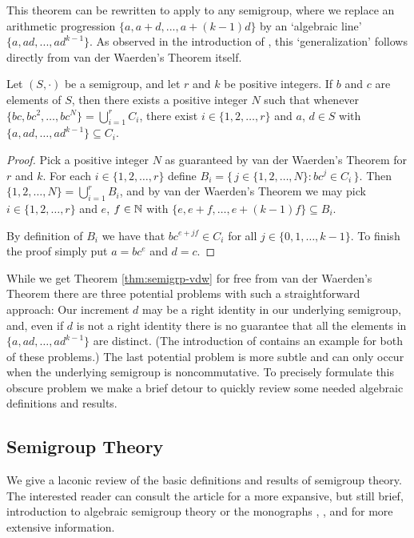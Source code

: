 This theorem can be rewritten to apply to any semigroup, where we replace an arithmetic progression $\{a, a+d, ..., a+(k-1)d\}$ by an `algebraic line' $\{a, ad, ..., ad^{k-1}\}$. As observed in the introduction of \cite{Bergelson:1992fk}, this `generalization' follows directly from van der Waerden's Theorem itself. 

\begin{thm}
  \label{thm:semigrp-vdw}
  Let $(S, \cdot)$ be a semigroup, and let $r$ and $k$ be positive integers.
  If $b$ and $c$ are elements of $S$, then there exists a positive integer $N$ such that whenever $\{bc, bc^2, \ldots, bc^N\} = \bigcup_{i=1}^r C_i$, there exist $i \in \{1, 2, \ldots, r\}$ and $a$, $d \in S$ with $\{a, ad, \ldots, ad^{k-1}\} \subseteq C_i$.
\end{thm}
\begin{proof}
  Pick a positive integer $N$ as guaranteed by van der Waerden's Theorem for $r$ and $k$.
  For each $i \in \{1, 2, \ldots, r\}$ define $B_i = \bigl\{\, j \in \{1, 2, \ldots, N\} : bc^j \in C_i \,\bigr\}$.
  Then $\{1, 2, \ldots, N\} = \bigcup_{i=1}^r B_i$, and by van der Waerden's Theorem we may pick $i \in \{1, 2, \ldots, r\}$ and $e$, $f \in \mathbb{N}$ with $\{e, e+f, \ldots, e+(k-1)f\} \subseteq B_i$.
  
  By definition of $B_i$ we have that $bc^{e+jf} \in C_i$ for all $j \in \{0, 1, \ldots, k-1\}$.
  To finish the proof simply put $a = bc^e$ and $d = c$.
\end{proof}

While we get Theorem \ref{thm:semigrp-vdw} for free from van der Waerden's Theorem there are three potential problems with such a straightforward approach:
Our increment $d$ may be a right identity in our underlying semigroup, and, even if $d$ is not a right identity there is no guarantee that all the elements in $\{a, ad, \ldots, ad^{k-1}\}$ are distinct.
(The introduction of \cite{Bergelson:1992fk} contains an example for both of these problems.)
The last potential problem is more subtle and can only occur when the underlying semigroup is noncommutative.
To precisely formulate this obscure problem we make a brief detour to quickly review some needed algebraic definitions and results.

\subsection{Semigroup Theory}
We give a laconic review of the basic definitions and results of semigroup theory.
The interested reader can consult the article \cite{Hollings:2007uq} for a more expansive, but still brief, introduction to algebraic semigroup theory or the monographs \cite{Clifford:1961fk}, \cite{Clifford:1967fk}, and \cite[Chapter 1]{Hindman:1998fk} for more extensive information. 


